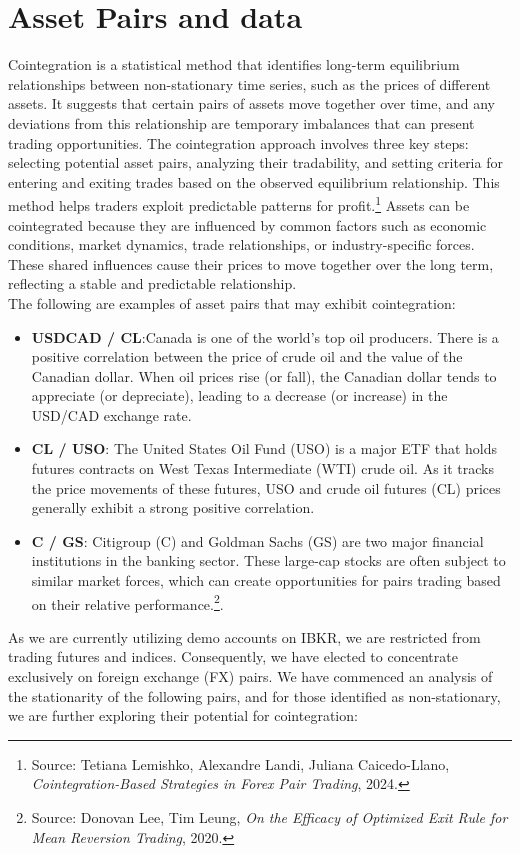 \documentclass{article}
\begin{document}
\section*{Asset Pairs and data}
Cointegration is a statistical method that identifies long-term equilibrium relationships between non-stationary time series, such as the prices of different assets. It suggests that certain pairs of assets move together over time, and any deviations from this relationship are temporary imbalances that can present trading opportunities. The cointegration approach involves three key steps: selecting potential asset pairs, analyzing their tradability, and setting criteria for entering and exiting trades based on the observed equilibrium relationship. This method helps traders exploit predictable patterns for profit.\footnote{Source: Tetiana Lemishko, Alexandre Landi, Juliana Caicedo-Llano, \textit{Cointegration-Based Strategies in Forex Pair Trading}, 2024.}
Assets can be cointegrated because they are influenced by common factors such as economic conditions, market dynamics, trade relationships, or industry-specific forces. These shared influences cause their prices to move together over the long term, reflecting a stable and predictable relationship.\\

The following are examples of asset pairs that may exhibit cointegration:
\begin{itemize}
    \item \textbf{USDCAD / CL}:Canada is one of the world's top oil producers. There is a positive correlation between the price of crude oil and the value of the Canadian dollar. When oil prices rise (or fall), the Canadian dollar tends to appreciate (or depreciate), leading to a decrease (or increase) in the USD/CAD exchange rate. 
    \item \textbf{CL / USO}: The United States Oil Fund (USO) is a major ETF that holds futures contracts on West Texas Intermediate (WTI) crude oil. As it tracks the price movements of these futures, USO and crude oil futures (CL) prices generally exhibit a strong positive correlation. 
    \item \textbf{C / GS}: Citigroup (C) and Goldman Sachs (GS) are two major financial institutions in the banking sector. These large-cap stocks are often subject to similar market forces, which can create opportunities for pairs trading based on their relative performance.\footnote{Source: Donovan Lee, Tim Leung, \textit{On the Efficacy of Optimized Exit Rule for Mean Reversion Trading}, 2020.}.
\end{itemize}
As we are currently utilizing demo accounts on IBKR, we are restricted from trading futures and indices. Consequently, we have elected to concentrate exclusively on foreign exchange (FX) pairs. We have commenced an analysis of the stationarity of the following pairs, and for those identified as non-stationary, we are further exploring their potential for cointegration:\\
\end{document}
